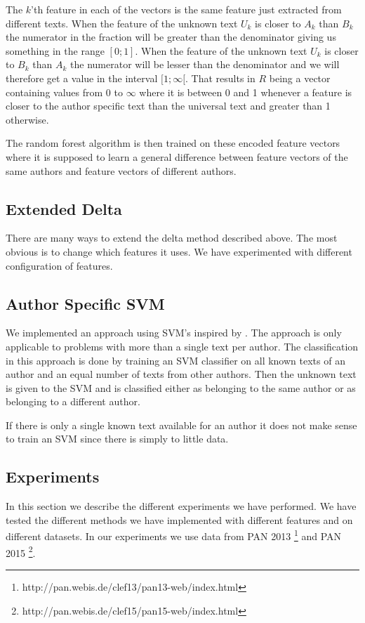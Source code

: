 The $k$'th feature in each of the vectors is the same feature just extracted
from different texts. When the feature of the unknown text $U_k$ is closer to
$A_k$ than $B_k$ the numerator in the fraction will be greater than the
denominator giving us something in the range $[0; 1]$. When the feature of the
unknown text $U_k$ is closer to $B_k$ than $A_k$ the numerator will be lesser
than the denominator and we will therefore get a value in the interval
$[1; \infty[$. That results in $R$ being a vector containing values from 0 to
$\infty$ where it is between 0 and 1 whenever a feature is closer to the author
specific text than the universal text and greater than 1 otherwise.

The random forest algorithm is then trained on these encoded feature vectors
where it is supposed to learn a general difference between feature vectors of
the same authors and feature vectors of different authors.

\subsection{Extended Delta}
There are many ways to extend the delta method described above. The most obvious
is to change which features it uses. We have experimented with different
configuration of features.

\subsection{Author Specific SVM} \label{subsec:author_specific_svm}
We implemented an approach using \gls{SVM}'s inspired by \cite{hansen2014}. The
approach is only applicable to problems with more than a single text per author.
The classification in this approach is done by training an \gls{SVM} classifier
on all known texts of an author and an equal number of texts from other authors.
Then the unknown text is given to the \gls{SVM} and is classified either as
belonging to the same author or as belonging to a different author.

If there is only a single known text available for an author it does not make
sense to train an \gls{SVM} since there is simply to little data.

\subsection{Experiments}
In this section we describe the different experiments we have performed.
We have tested the different methods we have implemented with different
features and on different datasets. In our experiments we use data from PAN
2013 \footnote{http://pan.webis.de/clef13/pan13-web/index.html} and PAN 2015
\footnote{http://pan.webis.de/clef15/pan15-web/index.html}.

